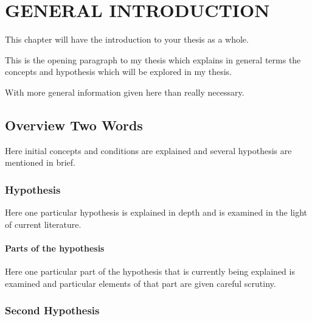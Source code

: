 \chapter{\MakeUppercase{General Introduction}}

This chapter will have the introduction to your thesis as a whole.

This is the opening paragraph to my thesis which
explains in general terms the concepts and hypothesis
which will be explored in my thesis.

With more general information given here than really
necessary.

\section{Overview Two Words}

Here initial concepts and conditions are explained and
several hypothesis are mentioned in brief.

\subsection{Hypothesis}

Here one particular hypothesis is explained in depth
and is examined in the light of current literature.

\subsubsection{Parts of the hypothesis}

Here one particular part of the hypothesis that is
currently being explained is examined and particular
elements of that part are given careful scrutiny.


\subsection{Second Hypothesis}

